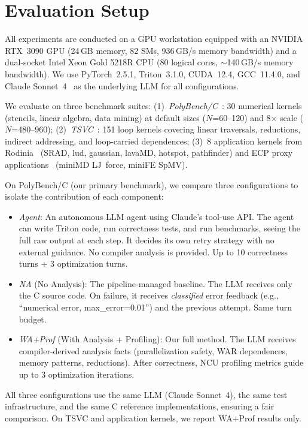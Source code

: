 
\section{Evaluation Setup}

All experiments are conducted on a GPU workstation equipped with an NVIDIA RTX~3090 GPU (24\,GB memory, 82 SMs, 936\,GB/s memory bandwidth) and a dual-socket Intel Xeon Gold 5218R CPU (80 logical cores, $\sim$140\,GB/s memory bandwidth).
We use PyTorch~2.5.1, Triton~3.1.0, CUDA~12.4, GCC~11.4.0, and Claude Sonnet~4~\cite{anthropic2025claude} as the underlying LLM for all configurations.

We evaluate on three benchmark suites:
(1)~\emph{PolyBench/C}~\cite{polybench}: 30 numerical kernels (stencils, linear algebra, data mining) at default sizes ($N$=60--120) and 8$\times$ scale ($N$=480--960);
(2)~\emph{TSVC}~\cite{callahan1988tsvc}: 151 loop kernels covering linear traversals, reductions, indirect addressing, and loop-carried dependences;
(3)~8 application kernels from Rodinia~\cite{che2009rodinia} (SRAD, lud, gaussian, lavaMD, hotspot, pathfinder) and ECP proxy applications~\cite{heroux2009mantevo} (miniMD LJ~force, miniFE SpMV).

On PolyBench/C (our primary benchmark), we compare three configurations to isolate the contribution of each component:
\begin{itemize}
\item \emph{Agent}: An autonomous LLM agent using Claude's tool-use API. The agent can write Triton code, run correctness tests, and run benchmarks, seeing the full raw output at each step. It decides its own retry strategy with no external guidance. No compiler analysis is provided. Up to 10 correctness turns + 3 optimization turns.
\item \emph{NA} (No Analysis): The pipeline-managed baseline. The LLM receives only the C source code. On failure, it receives \emph{classified} error feedback (e.g., ``numerical error, max\_error=0.01'') and the previous attempt. Same turn budget.
\item \emph{WA+Prof} (With Analysis + Profiling): Our full method. The LLM receives compiler-derived analysis facts (parallelization safety, WAR dependences, memory patterns, reductions). After correctness, NCU profiling metrics guide up to 3 optimization iterations.
\end{itemize}
All three configurations use the same LLM (Claude Sonnet~4), the same test infrastructure, and the same C reference implementations, ensuring a fair comparison.
On TSVC and application kernels, we report WA+Prof results only.

